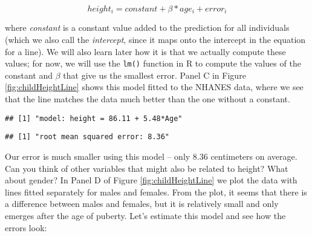 \documentclass[]{book}
\newenvironment{Shaded}{\begin{snugshade}}{\end{snugshade}}
\newcommand{\KeywordTok}[1]{\textcolor[rgb]{0.13,0.29,0.53}{\textbf{#1}}}
\newcommand{\DataTypeTok}[1]{\textcolor[rgb]{0.13,0.29,0.53}{#1}}
\newcommand{\DecValTok}[1]{\textcolor[rgb]{0.00,0.00,0.81}{#1}}
\newcommand{\StringTok}[1]{\textcolor[rgb]{0.31,0.60,0.02}{#1}}
\newcommand{\CommentTok}[1]{\textcolor[rgb]{0.56,0.35,0.01}{\textit{#1}}}
\newcommand{\OperatorTok}[1]{\textcolor[rgb]{0.81,0.36,0.00}{\textbf{#1}}}
\newcommand{\NormalTok}[1]{#1}
\theoremstyle{definition}
\theoremstyle{definition}
\theoremstyle{definition}
\theoremstyle{remark}
\begin{document}
\[
height_i = constant + \beta * age_i + error_i
\]

where \emph{constant} is a constant value added to the prediction for
all individuals (which we also call the \emph{intercept}, since it maps
onto the intercept in the equation for a line). We will also learn later
how it is that we actually compute these values; for now, we will use
the \texttt{lm()} function in R to compute the values of the constant
and \(\beta\) that give us the smallest error. Panel C in Figure
\ref{fig:childHeightLine} shows this model fitted to the NHANES data,
where we see that the line matches the data much better than the one
without a constant.

\begin{verbatim}
## [1] "model: height = 86.11 + 5.48*Age"
\end{verbatim}

\begin{verbatim}
## [1] "root mean squared error: 8.36"
\end{verbatim}

Our error is much smaller using this model -- only 8.36 centimeters on
average. Can you think of other variables that might also be related to
height? What about gender? In Panel D of Figure
\ref{fig:childHeightLine} we plot the data with lines fitted separately
for males and females. From the plot, it seems that there is a
difference between males and females, but it is relatively small and
only emerges after the age of puberty. Let's estimate this model and see
how the errors look:

\begin{Shaded}
\end{Shaded}
\end{document}

